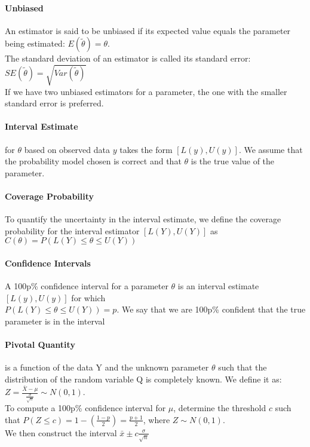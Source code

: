     \paragraph{Unbiased} An estimator is said to be unbiased if its expected
    value equals the parameter being estimated: $E(\tilde{\theta}) = \theta$.\\
    The standard deviation of an estimator is called its standard error:
    $SE(\tilde{\theta}) = \sqrt{Var(\tilde{\theta})}$\\
    If we have two unbiased estimators for a parameter, the one with the
    smaller standard error is preferred.

    \paragraph{Interval Estimate} for $\theta$ based on observed data $y$ takes
    the form $[L(y), U(y)]$. We assume that the probability model chosen is
    correct and that $\theta$ is the true value of the parameter.

    \paragraph{Coverage Probability} To quantify the uncertainty in the
    interval estimate, we define the coverage probability for the interval
    estimator $[L(Y), U(Y)]$ as \\
    $C(\theta) = P(L(Y) \leq \theta \leq U(Y))$

    \paragraph{Confidence Intervals} A 100p\% confidence interval for a
    parameter $\theta$ is an interval estimate $[L(y), U(y)]$ for which\\
    $P(L(Y) \leq \theta \leq U(Y)) = p$. We say that we are 100p\% confident
    that the true parameter is in the interval

    \paragraph{Pivotal Quantity} is a function of the data Y and the unknown
    parameter $\theta$ such that the distribution of the random variable Q is
    completely known.  We define it as: $Z = \frac{\bar{X} -
    \mu}{\frac{\sigma}{\sqrt{n}}} \sim N(0, 1)$. \\
    To compute a 100p\% confidence interval for $\mu$, determine the threshold
    $c$ such that $P(Z \leq c) = 1 - (\frac{1-p}{2}) = \frac{p+1}{2}$, where $Z
    \sim N(0, 1)$.\\
    We then construct the interval $\bar{x} \pm c\frac{\sigma}{\sqrt{n}}$
